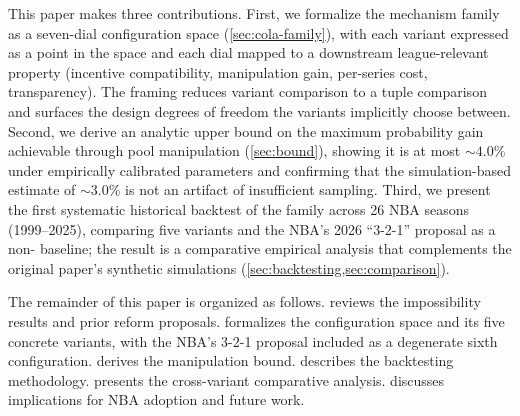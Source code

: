 This paper makes three contributions. First, we formalize the \cola{} mechanism family as a seven-dial configuration space (\cref{sec:cola-family}), with each variant expressed as a point in the space and each dial mapped to a downstream league-relevant property (incentive compatibility, manipulation gain, per-series cost, transparency). The framing reduces variant comparison to a tuple comparison and surfaces the design degrees of freedom the variants implicitly choose between. Second, we derive an analytic upper bound on the maximum probability gain achievable through pool manipulation (\cref{sec:bound}), showing it is at most ${\sim}4.0\%$ under empirically calibrated parameters and confirming that the simulation-based estimate of ${\sim}3.0\%$ is not an artifact of insufficient sampling. Third, we present the first systematic historical backtest of the \cola{} family across 26 NBA seasons (1999--2025), comparing five \cola{} variants and the NBA's 2026 ``3-2-1'' proposal as a non-\cola{} baseline; the result is a comparative empirical analysis that complements the original paper's synthetic simulations (\cref{sec:backtesting,sec:comparison}).

The remainder of this paper is organized as follows.  reviews the impossibility results and prior reform proposals.  formalizes the \cola{} configuration space and its five concrete variants, with the NBA's 3-2-1 proposal included as a degenerate sixth configuration.  derives the manipulation bound.  describes the backtesting methodology.  presents the cross-variant comparative analysis.  discusses implications for NBA adoption and future work.
